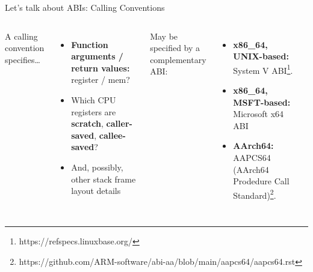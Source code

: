 \begin{frame}{Let's talk about ABIs: Calling Conventions}
  \begin{columns}
    A calling convention specifies\ldots{}
    \begin{itemize}
      \item \textbf{Function arguments / return values:} register / mem?
      \item Which CPU registers are \textbf{scratch}, \textbf{caller-saved}, \textbf{callee-saved}?
      \item And, possibly, other stack frame layout details
        \bigskip
    \end{itemize}
    \vfill
    May be specified by a complementary ABI:
    \begin{itemize}
      \item \textbf{x86\_64, UNIX-based:} System V ABI\footnote{https://refspecs.linuxbase.org/}.
      \item \textbf{x86\_64, MSFT-based:} Microsoft x64 ABI
      \item \textbf{AArch64:} AAPCS64 (AArch64 Prodedure Call Standard)\footnote{https://github.com/ARM-software/abi-aa/blob/main/aapcs64/aapcs64.rst}.
    \end{itemize}

    \begin{center}
      \resizebox{0.95\columnwidth}{!}{}
    \end{center}
  \end{columns}
\end{frame}
